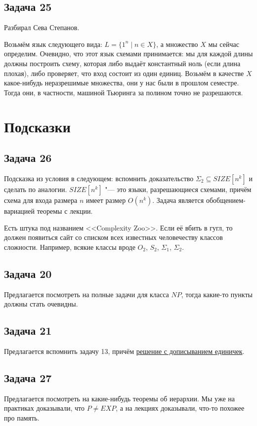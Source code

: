 \subsection{Задача 25}
	Разбирал Сева Степанов.

	Возьмём язык следующего вида: $L = \{1^n \mid n \in X\}$, а множество
	$X$ мы сейчас определим.
	Очевидно, что этот язык схемами принимается: мы для каждой длины должны построить схему,
	которая либо выдаёт константный ноль (если длина плохая), либо проверяет, что вход состоит
	из один единиц.
	Возьмём в качестве $X$ какое-нибудь неразрешимые множества, они у нас были в прошлом семестре.
	Тогда они, в частности, машиной Тьюринга за полином точно не разрешаются.

\section{Подсказки}
\subsection{Задача 26}
	Подсказка из условия в следующем: вспомнить доказательство $\Sigma_2 \subseteq SIZE[n^k]$
	и сделать по аналогии.
	$SIZE[n^k]$ "--- это языки, разрешающиеся схемами, причём схема для входа размера $n$ имеет размер $O(n^k)$.
	Задача является обобщением-вариацией теоремы с лекции.

	Есть штука под названием <<Complexity Zoo>>.
	Если её вбить в гугл, то должен появиться сайт со списком всех известных человечеству классов сложности.
	Например, всякие классы вроде $O_2$, $S_2$, $\Sigma_1$, $\Sigma_2$.

\subsection{Задача 20}
	Предлагается посмотреть на полные задачи для класса $NP$, тогда какие-то пункты должны стать очевидны.

\subsection{Задача 21}
	Предлагается вспомнить задачу 13, причём \hyperref[prob13_sol2]{решение с дописыванием единичек}.

\subsection{Задача 27}
	Предлагается посмотреть на какие-нибудь теоремы об иерархии.
	Мы уже на практиках доказывали, что $P \neq EXP$, а на лекциях доказывали, что-то похожее про память.
